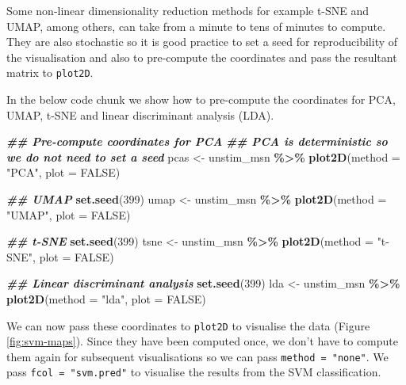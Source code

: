 \documentclass[9pt,a4paper,]{extarticle}
\newenvironment{Shaded}{\begin{snugshade}}{\end{snugshade}}
\newcommand{\AttributeTok}[1]{\textcolor[rgb]{0.13,0.29,0.53}{#1}}
\newcommand{\ConstantTok}[1]{\textcolor[rgb]{0.56,0.35,0.01}{#1}}
\newcommand{\DecValTok}[1]{\textcolor[rgb]{0.00,0.00,0.81}{#1}}
\newcommand{\DocumentationTok}[1]{\textcolor[rgb]{0.56,0.35,0.01}{\textbf{\textit{#1}}}}
\newcommand{\FunctionTok}[1]{\textcolor[rgb]{0.13,0.29,0.53}{\textbf{#1}}}
\newcommand{\NormalTok}[1]{#1}
\newcommand{\OtherTok}[1]{\textcolor[rgb]{0.56,0.35,0.01}{#1}}
\newcommand{\SpecialCharTok}[1]{\textcolor[rgb]{0.81,0.36,0.00}{\textbf{#1}}}
\newcommand{\StringTok}[1]{\textcolor[rgb]{0.31,0.60,0.02}{#1}}
\begin{document}
Some non-linear dimensionality reduction methods for example t-SNE and UMAP,
among others, can take from a minute to tens of minutes to compute. They
are also stochastic so it is good practice to set a seed for reproducibility of
the visualisation and also to pre-compute the coordinates and pass the
resultant matrix to \texttt{plot2D}.

In the below code chunk we show how to pre-compute the coordinates for PCA,
UMAP, t-SNE and linear discriminant analysis (LDA).

\begin{Shaded}
\begin{Highlighting}[]
\DocumentationTok{\#\# Pre{-}compute coordinates for PCA}
\DocumentationTok{\#\# PCA is deterministic so we do not need to set a seed}
\NormalTok{pcas }\OtherTok{\textless{}{-}}\NormalTok{ unstim\_msn }\SpecialCharTok{\%\textgreater{}\%}
  \FunctionTok{plot2D}\NormalTok{(}\AttributeTok{method =} \StringTok{"PCA"}\NormalTok{, }\AttributeTok{plot =} \ConstantTok{FALSE}\NormalTok{)}

\DocumentationTok{\#\# UMAP}
\FunctionTok{set.seed}\NormalTok{(}\DecValTok{399}\NormalTok{)}
\NormalTok{umap }\OtherTok{\textless{}{-}}\NormalTok{ unstim\_msn }\SpecialCharTok{\%\textgreater{}\%}
  \FunctionTok{plot2D}\NormalTok{(}\AttributeTok{method =} \StringTok{"UMAP"}\NormalTok{, }\AttributeTok{plot =} \ConstantTok{FALSE}\NormalTok{)}

\DocumentationTok{\#\# t{-}SNE}
\FunctionTok{set.seed}\NormalTok{(}\DecValTok{399}\NormalTok{)}
\NormalTok{tsne }\OtherTok{\textless{}{-}}\NormalTok{ unstim\_msn }\SpecialCharTok{\%\textgreater{}\%} 
  \FunctionTok{plot2D}\NormalTok{(}\AttributeTok{method =} \StringTok{"t{-}SNE"}\NormalTok{, }\AttributeTok{plot =} \ConstantTok{FALSE}\NormalTok{)}

\DocumentationTok{\#\# Linear discriminant analysis}
\FunctionTok{set.seed}\NormalTok{(}\DecValTok{399}\NormalTok{)}
\NormalTok{lda }\OtherTok{\textless{}{-}}\NormalTok{ unstim\_msn }\SpecialCharTok{\%\textgreater{}\%}
  \FunctionTok{plot2D}\NormalTok{(}\AttributeTok{method =} \StringTok{"lda"}\NormalTok{, }\AttributeTok{plot =} \ConstantTok{FALSE}\NormalTok{)}
\end{Highlighting}
\end{Shaded}

We can now pass these coordinates to \texttt{plot2D} to visualise the data
(Figure \ref{fig:svm-maps}). Since they
have been computed once, we don't have to compute them again for subsequent
visualisations so we can pass \texttt{method\ =\ "none"}. We pass \texttt{fcol\ =\ "svm.pred"}
to visualise the results from the SVM classification.
\end{document}
